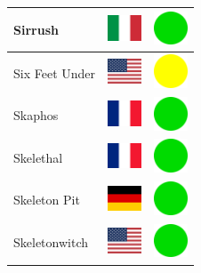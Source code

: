 \documentclass[12pt, a4paper, twoside]{report}
\begin{document}
\begin{center}
\begin{longtable}{|p{5cm}|p{2cm}|p{2cm}|}
Sirrush & \includegraphics[width=1cm]{4x3/it} & \includegraphics[width=1cm]{likes/y} \\ \hline
Six Feet Under & \includegraphics[width=1cm]{4x3/us} & \includegraphics[width=1cm]{likes/m} \\ \hline
Skaphos & \includegraphics[width=1cm]{4x3/fr} & \includegraphics[width=1cm]{likes/y} \\ \hline
Skelethal & \includegraphics[width=1cm]{4x3/fr} & \includegraphics[width=1cm]{likes/y} \\ \hline
Skeleton Pit & \includegraphics[width=1cm]{4x3/de} & \includegraphics[width=1cm]{likes/y} \\ \hline
Skeletonwitch & \includegraphics[width=1cm]{4x3/us} & \includegraphics[width=1cm]{likes/y} \\ \hline

\end{longtable}
\end{center}
\end{document}
